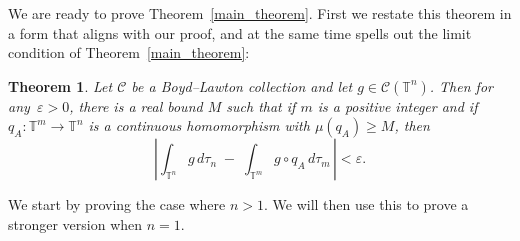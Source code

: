 \documentclass[12pt]{amsart}
\theoremstyle{plain}
\newtheorem{theorem}{Theorem}
\theoremstyle{definition}
\theoremstyle{remark}
\numberwithin{theorem}{section}
\numberwithin{equation}{section} %
\newcommand{\mc}{\mathcal}
\newcommand{\torus}{{\mathbb{T}}}
\begin{document}
We are ready to prove Theorem~\ref{main_theorem}. First we restate this theorem in a form that aligns with our
proof, and at the same time spells out the limit condition of Theorem~\ref{main_theorem}:

\begin{theorem} \label{main_theorem_alt}
Let $\mc C$ be a Boyd--Lawton collection and let $g \in \mc C(\torus^n)$.
Then for any~$\varepsilon > 0$, there is a real bound $M$ such that if $m$ is a positive integer
and if $q_A \colon \torus^m \to \torus^n$ is a continuous homomorphism with $\mu\left(q_A\right) \ge M$,
then 
$$
\left|   \int_{\torus^{n}} g \, d \tau_{n}
 \; - \; 
\int_{\torus^m} g \circ q_A \, d \tau_m \,
\right|
< \varepsilon.
$$
\end{theorem}

We start by proving the case where $n>1$. We will then use this to prove a stronger version when $n=1$.
\end{document}
